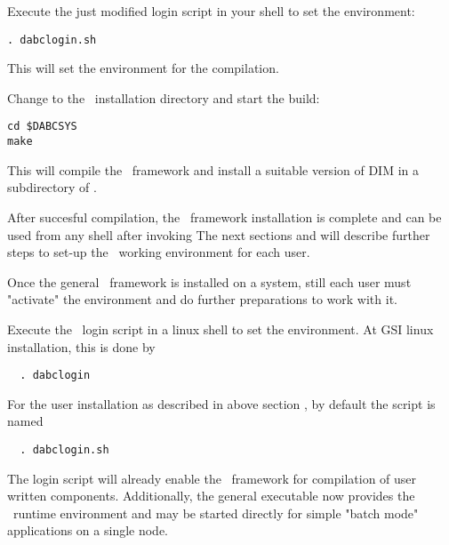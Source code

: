 \item Execute the just modified login script in your shell to set the environment:  
\begin{small}
\begin{verbatim}
. dabclogin.sh
\end{verbatim} 
\end{small}
This will set the environment for the compilation.

\item Change to the \dabc\ installation directory and start the build:
\begin{small}
\begin{verbatim}
cd $DABCSYS
make
\end{verbatim} 
\end{small}
This will compile the \dabc\ framework and install a suitable version of DIM in a
subdirectory of .

\enum

After succesful compilation, the \dabc\ framework installation is complete
and can be used from any shell after invoking 
The next sections  and  will describe further steps 
to set-up the \dabc\ working environment for each user.


Once the general \dabc\ framework is installed on a system, still each user
must "activate" the environment and do further preparations to work with it.

\bnum
\item Execute the \dabc\ login script in a linux shell to set the environment.
At GSI linux installation, this is done by  
\begin{small}
\begin{verbatim}
  . dabclogin
\end{verbatim} 
\end{small}
For the user installation as described in above section ,
by default the script is named   
\begin{small}
\begin{verbatim}
  . dabclogin.sh
\end{verbatim}
\end{small}

The login script will already enable the \dabc\ framework for
compilation of user written components. Additionally, 
the general executable  now provides
the \dabc\ runtime environment and may be started directly 
for simple "batch mode" applications on a single node. 

